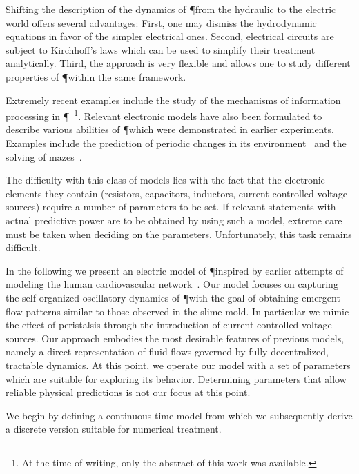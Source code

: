   Shifting the description of the dynamics of \P from the hydraulic to the electric world offers several advantages: First, one may dismiss the hydrodynamic equations in favor of the simpler electrical ones. Second, electrical circuits are subject to Kirchhoff's laws which can be used to simplify their treatment analytically. Third, the approach is very flexible and allows one to study different properties of \P within the same framework. 

  Extremely recent examples include the study of the mechanisms of information processing in \P~\cite{tagung2017}\footnote{At the time of writing, only the abstract of this work was available.}. Relevant electronic models have also been formulated to describe various abilities of \P which were demonstrated in earlier experiments. Examples include the prediction of periodic changes in its environment~\cite{pershin2009memristive} and the solving of mazes~\cite{ntinas2016oscillation}.

  The difficulty with this class of models lies with the fact that the electronic elements they contain (resistors, capacitors, inductors, current controlled voltage sources) require a number of parameters to be set. If relevant statements with actual predictive power are to be obtained by using such a model, extreme care must be taken when deciding on the parameters. Unfortunately, this task remains difficult.

  In the following we present an electric model of \P inspired by earlier attempts of modeling the human cardiovascular network~\cite{stefanovska1999physics,dePater1964}. Our model focuses on capturing the self-organized oscillatory dynamics of \P with the goal of obtaining emergent flow patterns similar to those observed in the slime mold. In particular we mimic the effect of peristalsis through the introduction of current controlled voltage sources. Our approach embodies the most desirable features of previous models, namely a direct representation of fluid flows governed by fully decentralized, tractable dynamics. 
  At this point, we operate our model with a set of parameters which are suitable for exploring its behavior. Determining parameters that allow reliable physical predictions is not our focus at this point.

  We begin by defining a continuous time model from which we subsequently derive a discrete version suitable for numerical treatment.
